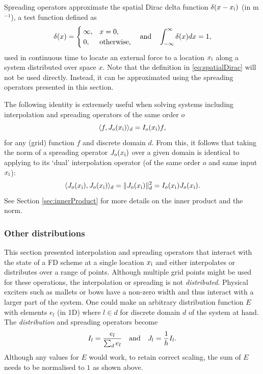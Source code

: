 Spreading operators approximate the spatial Dirac delta function $\delta(x-x_{\text{i}})$ (in m$^{-1}$), a test function defined as
\begin{equation}\label{eq:spatialDirac}
    \delta(x)= \begin{cases}
        \infty, & x = 0,\\
        0, & \text{otherwise},
    \end{cases} \quad \text{and} \quad \int_{-\infty}^{\infty} \delta(x)dx = 1,
\end{equation}
used in continuous time to locate an external force to a location $x_{\text{i}}$ along a system distributed over space $x$. Note that the definition in \eqref{eq:spatialDirac} will not be used directly. Instead, it can be approximated using the spreading operators presented in this section. 

The following identity is extremely useful when solving systems including interpolation and spreading operators of the same order $o$
\begin{equation}\label{eq:identityIJ}
    \langle f, J_o(x_{\text{i}}) \rangle_d = I_o(x_{\text{i}}) f,
\end{equation}
for any (grid) function $f$ and discrete domain $d$. From this, it follows that taking the norm of a spreading operator $J_o(x_{\text{i}})$ over a given domain is identical to applying to its `dual' interpolation operator (of the same order $o$ and same input $x_{\text{i}}$):
\begin{equation}\label{eq:JnormIJ}
    \langle  J_o(x_{\text{i}}), J_o(x_{\text{i}})\rangle_d = \lVert J_o(x_{\text{i}})\rVert^2_d = I_o(x_{\text{i}})J_o(x_{\text{i}}).
\end{equation}
See Section \ref{sec:innerProduct} for more details on the inner product and the norm.

\subsubsection{Other distributions}
This section presented interpolation and spreading operators that interact with the state of a FD scheme at a single location $x_{\text{i}}$ and either interpolates or distributes over a range of points. Although multiple grid points might be used for these operations, the interpolation or spreading is not \textit{distributed}. Physical exciters such as mallets or bows have a non-zero width and thus interact with a larger part of the system. One could make an arbitrary distribution function $E$ with elements $e_l$ (in 1D) where $l\in d$ for discrete domain $d$ of the system at hand. The \textit{distribution} and spreading operators become
\begin{equation}
    I_l = \frac{e_l}{\sum_d e_l} \quad \text{and} \quad J_l = \frac{1}{h}I_l.
\end{equation}
Although any values for $E$ would work, to retain correct scaling, the sum of $E$ needs to be normalised to $1$ as shown above.

